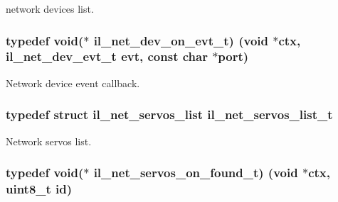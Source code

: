 network devices list. 

\subsubsection[{\texorpdfstring{il\+\_\+net\+\_\+dev\+\_\+on\+\_\+evt\+\_\+t}{il_net_dev_on_evt_t}}]{\setlength{\rightskip}{0pt plus 5cm}typedef void($\ast$ il\+\_\+net\+\_\+dev\+\_\+on\+\_\+evt\+\_\+t) (void $\ast$ctx, {\bf il\+\_\+net\+\_\+dev\+\_\+evt\+\_\+t} evt, const char $\ast$port)}\hypertarget{group__IL__NET_ga86bfa409239ad771481bd4dd1a451367}{}\label{group__IL__NET_ga86bfa409239ad771481bd4dd1a451367}


Network device event callback. 

\subsubsection[{\texorpdfstring{il\+\_\+net\+\_\+servos\+\_\+list\+\_\+t}{il_net_servos_list_t}}]{\setlength{\rightskip}{0pt plus 5cm}typedef struct {\bf il\+\_\+net\+\_\+servos\+\_\+list}  {\bf il\+\_\+net\+\_\+servos\+\_\+list\+\_\+t}}\hypertarget{group__IL__NET_ga81660630b147245b0a160f13ef465811}{}\label{group__IL__NET_ga81660630b147245b0a160f13ef465811}


Network servos list. 

\subsubsection[{\texorpdfstring{il\+\_\+net\+\_\+servos\+\_\+on\+\_\+found\+\_\+t}{il_net_servos_on_found_t}}]{\setlength{\rightskip}{0pt plus 5cm}typedef void($\ast$ il\+\_\+net\+\_\+servos\+\_\+on\+\_\+found\+\_\+t) (void $\ast$ctx, uint8\+\_\+t id)}\hypertarget{group__IL__NET_ga4ba09545bd04fa6df4f0a26f14df84f7}{}\label{group__IL__NET_ga4ba09545bd04fa6df4f0a26f14df84f7}


